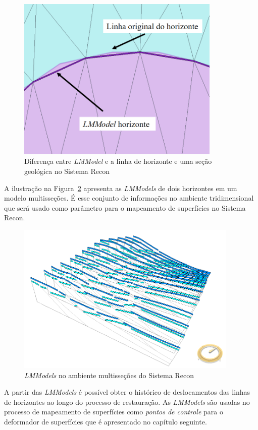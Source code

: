 \begin{figure} [h!]
  \begin{center}
    \includegraphics[width=275pt]{images/fig-lmmodel-mesh-diff}
    \caption{Diferença entre \textit{LMModel} e a linha de horizonte e uma seção geológica no Sistema Recon}\label{fig-lmmodel-mesh-diff}
  \end{center}
\end{figure}

A ilustração na Figura~\ref{fig-lmmodel-ms} apresenta as \textit{LMModels} de dois horizontes em um modelo multisseções. É esse conjunto de informações no ambiente tridimensional que será usado como parâmetro para o mapeamento de superfícies no Sistema Recon.

\begin{figure} [h!]
  \begin{center}
    \includegraphics[width=300pt]{images/fig-lmmodel-ms}
    \caption{\textit{LMModels} no ambiente multisseções do Sistema Recon}\label{fig-lmmodel-ms}
  \end{center}
\end{figure}

A partir das \emph{LMModels} é possível obter o histórico de deslocamentos das linhas de horizontes ao longo do processo de restauração. As \emph{LMModels} são usadas no processo de mapeamento de superfícies como \emph{pontos de controle} para o deformador de superfícies que é apresentado no capítulo seguinte.


